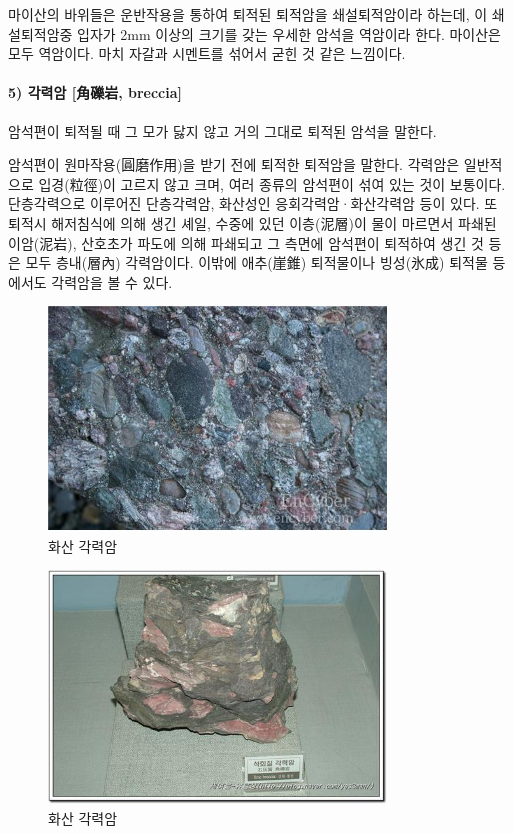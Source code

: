 \documentclass[12pt, a4paper, twoside]{book}
\begin{document}
				마이산의 바위들은 운반작용을 통하여 퇴적된 퇴적암을 쇄설퇴적암이라 하는데, 이 쇄설퇴적암중 입자가 2mm 이상의 크기를 갖는 우세한 암석을 역암이라 한다. 
				마이산은 모두 역암이다. 
				마치 자갈과 시멘트를 섞어서 굳힌 것 같은 느낌이다.
				
				
				
			\paragraph{5) 각력암 [角礫岩, breccia]  }
				
				암석편이 퇴적될 때 그 모가 닳지 않고 거의 그대로 퇴적된 암석을 말한다.
				
				암석편이 원마작용(圓磨作用)을 받기 전에 퇴적한 퇴적암을 말한다. 각력암은 일반적으로 입경(粒徑)이 고르지 않고 크며, 여러 종류의 암석편이 섞여 있는 것이 보통이다. 
				단층각력으로 이루어진 단층각력암, 화산성인 응회각력암·화산각력암 등이 있다. 
				또 퇴적시 해저침식에 의해 생긴 셰일, 수중에 있던 이층(泥層)이 물이 마르면서 파쇄된 이암(泥岩), 산호초가 파도에 의해 파쇄되고 그 측면에 암석편이 퇴적하여 생긴 것 등은 모두 층내(層內) 각력암이다. 
				이밖에 애추(崖錐) 퇴적물이나 빙성(氷成) 퇴적물 등에서도 각력암을 볼 수 있다.
				


				\begin{figure}[h]
				\centering
				\caption{화산 각력암}
				\includegraphics[width=0.8\textwidth]{./fig/SedimentaryRock_0002.jpg}
				\end{figure}

				\begin{figure}[h]
				\centering
				\caption{화산 각력암}
				\includegraphics[width=0.8\textwidth]{./fig/SedimentaryRock_0003.jpg}
				\end{figure}
\end{document}
